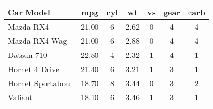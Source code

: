 \begin{tabular}{lcccccc}
\hline
\textbf{Car Model} & \textbf{mpg} & \textbf{cyl} & \textbf{wt} & \textbf{vs} & \textbf{gear} & \textbf{carb} \\
\hline
Mazda RX4 & 21.00 & 6 & 2.62 & 0 & 4 & 4\\
Mazda RX4 Wag & 21.00 & 6 & 2.88 & 0 & 4 & 4\\
Datsun 710 & 22.80 & 4 & 2.32 & 1 & 4 & 1\\
Hornet 4 Drive & 21.40 & 6 & 3.21 & 1 & 3 & 1\\
Hornet Sportabout & 18.70 & 8 & 3.44 & 0 & 3 & 2\\
Valiant & 18.10 & 6 & 3.46 & 1 & 3 & 1\\
\hline
\end{tabular}
